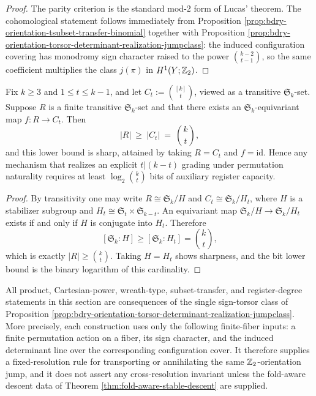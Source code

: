 \begin{proof}
The parity criterion is the standard mod-\(2\) form of Lucas' theorem.
The cohomological statement follows immediately from Proposition \ref{prop:bdry-orientation-tsubset-transfer-binomial} together with Proposition \ref{prop:bdry-orientation-torsor-determinant-realization-jumpclass}: the induced configuration covering has monodromy sign character raised to the power \(\binom{k-2}{t-1}\), so the same coefficient multiplies the class \(j(\pi)\) in \(H^1(Y;\mathbb{Z}_2)\). \qedhere
\end{proof}

\begin{proposition}\label{prop:bdry-equvariant-register-min-degree-choose}
Fix \(k\ge 3\) and \(1\le t\le k-1\), and let \(C_t:=\binom{[k]}{t}\), viewed as a transitive \(\mathfrak S_k\)-set.
Suppose \(R\) is a finite transitive \(\mathfrak S_k\)-set and that there exists an \(\mathfrak S_k\)-equivariant map \(f:R\to C_t\).
Then
\[
|R|\ \ge\ |C_t|\ =\ \binom{k}{t},
\]
and this lower bound is sharp, attained by taking \(R=C_t\) and \(f=\mathrm{id}\).
Hence any mechanism that realizes an explicit \(t|(k-t)\) grading under permutation naturality requires at least \(\log_2\binom{k}{t}\) bits of auxiliary register capacity.
\end{proposition}

\begin{proof}
By transitivity one may write \(R\cong \mathfrak S_k/H\) and \(C_t\cong \mathfrak S_k/H_t\), where \(H\) is a stabilizer subgroup and \(H_t\cong \mathfrak S_t\times \mathfrak S_{k-t}\).
An equivariant map \(\mathfrak S_k/H\to \mathfrak S_k/H_t\) exists if and only if \(H\) is conjugate into \(H_t\).
Therefore
\[
[\mathfrak S_k:H]\ge [\mathfrak S_k:H_t]=\binom{k}{t},
\]
which is exactly \(|R|\ge \binom{k}{t}\).
Taking \(H=H_t\) shows sharpness, and the bit lower bound is the binary logarithm of this cardinality. \qedhere
\end{proof}

\begin{corollary}\label{cor:bdry-orientation-finite-fiber-envelope}
All product, Cartesian-power, wreath-type, subset-transfer, and register-degree statements in this section are consequences of the single sign-torsor class of Proposition \ref{prop:bdry-orientation-torsor-determinant-realization-jumpclass}.  More precisely, each construction uses only the following finite-fiber inputs: a finite permutation action on a fiber, its sign character, and the induced determinant line over the corresponding configuration cover.  It therefore supplies a fixed-resolution rule for transporting or annihilating the same \(\mathbb{Z}_2\)-orientation jump, and it does not assert any cross-resolution invariant unless the fold-aware descent data of Theorem \ref{thm:fold-aware-stable-descent} are supplied.
\end{corollary}

